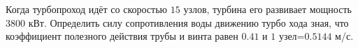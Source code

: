 Когда турбопроход идёт со скоростью $15$ узлов, турбина его развивает 
мощность $3800$ кВт. Определить силу сопротивления воды движению турбо
хода зная, что коэффициент полезного действия трубы и винта равен $0.41$
и $1$ узел=$0.5144$ м/с.
